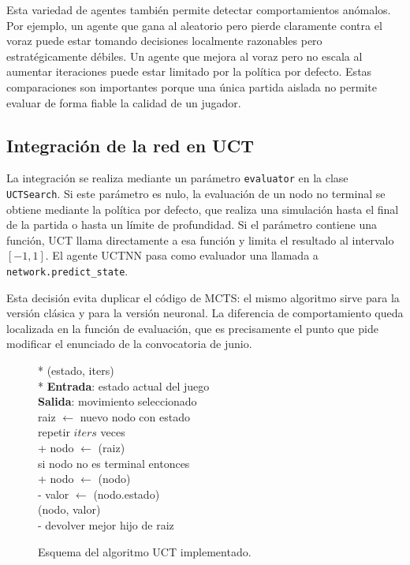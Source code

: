 \documentclass[conference,a4paper]{IEEEtran}
\begin{document}
Esta variedad de agentes también permite detectar comportamientos anómalos. Por
ejemplo, un agente que gana al aleatorio pero pierde claramente contra el voraz
puede estar tomando decisiones localmente razonables pero estratégicamente
débiles. Un agente que mejora al voraz pero no escala al aumentar iteraciones
puede estar limitado por la política por defecto. Estas comparaciones son
importantes porque una única partida aislada no permite evaluar de forma fiable
la calidad de un jugador.

\subsection{Integración de la red en UCT}

La integración se realiza mediante un parámetro \texttt{evaluator} en la clase
\texttt{UCTSearch}. Si este parámetro es nulo, la evaluación de un nodo no
terminal se obtiene mediante la política por defecto, que realiza una simulación
hasta el final de la partida o hasta un límite de profundidad. Si el parámetro
contiene una función, UCT llama directamente a esa función y limita el resultado
al intervalo \([-1,1]\). El agente UCTNN pasa como evaluador una llamada a
\texttt{network.predict\_state}.

Esta decisión evita duplicar el código de MCTS: el mismo algoritmo sirve para la
versión clásica y para la versión neuronal. La diferencia de comportamiento
queda localizada en la función de evaluación, que es precisamente el punto que
pide modificar el enunciado de la convocatoria de junio.

\begin{figure}[t]
\begin{pseudo}*
(estado, iters) \\*
\textbf{Entrada}: estado actual del juego \\
\textbf{Salida}: movimiento seleccionado \\
raiz \(\leftarrow\) nuevo nodo con estado \\
repetir \(iters\) veces \\+
  nodo \(\leftarrow\) (raiz) \\
  si nodo no es terminal entonces \\+
    nodo \(\leftarrow\) (nodo) \\-
  valor \(\leftarrow\) (nodo.estado) \\
  (nodo, valor) \\-
devolver mejor hijo de raiz
\end{pseudo}
\caption{Esquema del algoritmo UCT implementado.}
\label{pcd:uct}
\end{figure}
\end{document}
